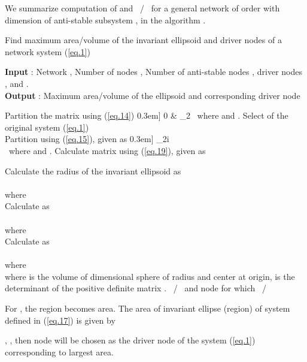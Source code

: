 \documentclass[conference]{IEEEtran}
\begin{document}
        We summarize computation of  and ~/~  for a general network of order  with dimension of anti-stable subsystem ,  in the algorithm .    
      \begin{algorithm}[H]
      \caption{Find maximum area/volume of the invariant ellipsoid and driver nodes of a network system (\ref{eq.1})}  \label{euclid1}
      \textbf{Input} : Network , Number of nodes , Number of anti-stable nodes , driver nodes ,  and . \\
      \textbf{Output} : Maximum area/volume of the ellipsoid and corresponding  driver node
      \begin{algorithmic}[1]
      \STATE Partition the matrix  using (\ref{eq.14})
      0.3em]
      0 & _{2}  \
      where  and .
      \FOR {  }
      \STATE Select  of the original system (\ref{eq.1}) \\
      \STATE Partition  using (\ref{eq.15}), given as
      0.3em]
      _{2i}  \\\
      where  and .
      \STATE Calculate matrix  using (\ref{eq.19}), given as
      
      \STATE Calculate the radius of the invariant ellipsoid  as \\
           \\
          where  \\
      \ENDFOR
      \IF {}
\STATE Calculate  as \\
         \\
        where  \\
       \ELSE
      \STATE Calculate  as \\
        \\
       where  \\
       where  is the volume of dimensional sphere  of radius  and center at origin,  is the determinant of the positive definite matrix .
       \ENDIF
       \RETURN{} ~/~ and node  for which ~/~
      \end{algorithmic}
      \end{algorithm}
 \begin{corol}
             	For , the region becomes area. The area of invariant ellipse (region) of system defined in (\ref{eq.17}) is given by
             		
             		, , then  node will be chosen as the driver node of the system (\ref{eq.1}) corresponding to largest area.
             	\end{corol}
      	
\end{document}
